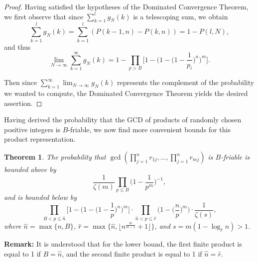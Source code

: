\documentclass[10pt,a4paper]{article}
\newtheorem{theorem}{Theorem}[section]
\theoremstyle{definition}
\theoremstyle{remark}
\begin{document}
\begin{proof}
Having satisfied the hypotheses of the Dominated Convergence Theorem, we first observe that since $\sum_{k=1}^l g_N(k)$ is a telescoping sum, we obtain
$$\sum_{k=1}^l g_N(k) = \sum_{k=1}^l (P(k-1, n) - P(k, n)) = 1 - P(l, N),$$ 
and thus
$$\lim_{N \to \infty} \sum_{k=1}^{\infty} g_N(k) = 1 - \prod_{p > B} \Big[1 - \Big(1 - \Big(1 - \frac{1}{p_i}  \Big)^n\Big)^m\Big].$$

\noindent Then since $\displaystyle \sum_{k=1}^{\infty} \lim_{N \to \infty} g_N(k)$ represents the complement of the probability we wanted to compute, the Dominated Convergence Theorem yields the desired assertion.
\end{proof}

Having derived the probability that the GCD of products of randomly chosen positive integers is $B$-friable, we now find more convenient bounds for this product representation.

\begin{theorem} The probability that $\gcd(\prod_{j=1}^n r_{1j}, ..., \prod_{j=1}^{n}r_{mj})$ is $B$-friable is bounded above by 
$$\frac{1}{\zeta(m)}\prod_{p\leq B}\Big(1-\frac{1}{p^m}\Big)^{-1},$$
and is bounded below by 
$$\prod_{B<p\leq\hat{n}} \Big[1 - \Big(1 - \Big(1 - \frac{1}{p}\Big)^n \Big)^m\Big] \cdot \prod_{\hat{n}<p\leq\hat{r}} \Big(1 - \Big(\frac{n}{p}\Big)^m\Big) \cdot \frac{1}{\zeta(s)},$$
where $\hat{n}=\max\{n,B\}$, $\hat{r}=\max\{\hat{n}, \lfloor n^{\frac{m}{m-1}}+1\rfloor\}$, and $s = m(1 - \log_{\hat{r}}{n}) > 1$.
\end{theorem} 

\noindent \textbf{Remark:} It is understood that for the lower bound, the first finite product is equal to 1 if $B = \hat{n}$, and the second finite product is equal to 1 if $\hat{n}=\hat{r}$.
 
\end{document}
